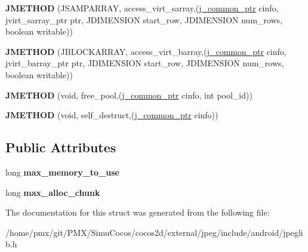 \begin{DoxyCompactItemize}
\item 
\mbox{\label{structjpeg__memory__mgr_a747ad4316a4794b13f9fdff4f6f699ca}} 
{\bfseries J\+M\+E\+T\+H\+OD} (J\+S\+A\+M\+P\+A\+R\+R\+AY, access\+\_\+virt\+\_\+sarray,(\hyperlink{structjpeg__common__struct}{j\+\_\+common\+\_\+ptr} cinfo, jvirt\+\_\+sarray\+\_\+ptr ptr, J\+D\+I\+M\+E\+N\+S\+I\+ON start\+\_\+row, J\+D\+I\+M\+E\+N\+S\+I\+ON num\+\_\+rows, boolean writable))
\item 
\mbox{\label{structjpeg__memory__mgr_aa460f4b500825e051306b8ce5583d052}} 
{\bfseries J\+M\+E\+T\+H\+OD} (J\+B\+L\+O\+C\+K\+A\+R\+R\+AY, access\+\_\+virt\+\_\+barray,(\hyperlink{structjpeg__common__struct}{j\+\_\+common\+\_\+ptr} cinfo, jvirt\+\_\+barray\+\_\+ptr ptr, J\+D\+I\+M\+E\+N\+S\+I\+ON start\+\_\+row, J\+D\+I\+M\+E\+N\+S\+I\+ON num\+\_\+rows, boolean writable))
\item 
\mbox{\label{structjpeg__memory__mgr_a7e7e063767441999982d22c5cc0e9423}} 
{\bfseries J\+M\+E\+T\+H\+OD} (void, free\+\_\+pool,(\hyperlink{structjpeg__common__struct}{j\+\_\+common\+\_\+ptr} cinfo, int pool\+\_\+id))
\item 
\mbox{\label{structjpeg__memory__mgr_ae80ddea0ba4f845f91d3a30e350b5f44}} 
{\bfseries J\+M\+E\+T\+H\+OD} (void, self\+\_\+destruct,(\hyperlink{structjpeg__common__struct}{j\+\_\+common\+\_\+ptr} cinfo))
\end{DoxyCompactItemize}
\subsection*{Public Attributes}
\begin{DoxyCompactItemize}
\item 
\mbox{\label{structjpeg__memory__mgr_aa7ef7c0d7ffbfcbee837ae9cb8b12c7e}} 
long {\bfseries max\+\_\+memory\+\_\+to\+\_\+use}
\item 
\mbox{\label{structjpeg__memory__mgr_a0301712c8796bb5555093d72b37c5a58}} 
long {\bfseries max\+\_\+alloc\+\_\+chunk}
\end{DoxyCompactItemize}


The documentation for this struct was generated from the following file\+:\begin{DoxyCompactItemize}
\item 
/home/pmx/git/\+P\+M\+X/\+Simu\+Cocos/cocos2d/external/jpeg/include/android/jpeglib.\+h\end{DoxyCompactItemize}

